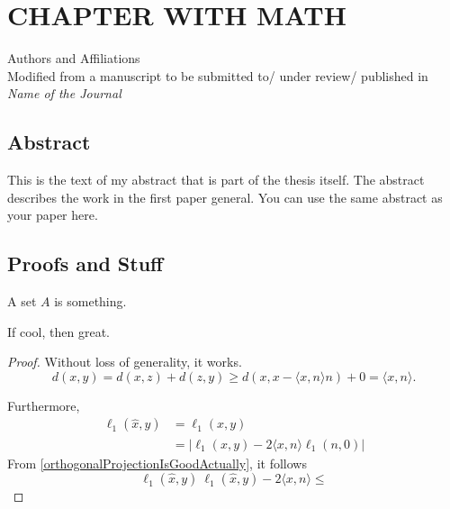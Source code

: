 \newcommand{\RipsD}{\operatorname{Rips}_1}
\newcommand{\Rips}{\operatorname{Rips}}
\newcommand{\ver}{\operatorname{ver}}
\newcommand{\diam}{\operatorname{Diam}}
\newcommand{\midR}{\operatorname{mid}}
\newcommand{\dN}{N_1^*}

\chapter{CHAPTER WITH MATH}
\begin{center}
    Authors and Affiliations \\
    Modified from a manuscript to be submitted to/ under review/ published in \textit{Name of the Journal}
\end{center}

\section{Abstract}
This is the text of my abstract that is part of the thesis itself.
The abstract describes the work in the first paper general. You can use the same abstract as your paper here.
\section{Proofs and Stuff}
\begin{definition}
    A set $A$ is something.
\end{definition}

\begin{lemma}
    If cool, then great.
\end{lemma}
\begin{proof}
    Without loss of generality, it works.
    \begin{equation}
    \label{orthogonalProjectionIsGoodActually}
        d(x,y)= d(x,z)+d(z,y) \geq d(x,x-\langle x,n\rangle n )+0 = \langle x,n\rangle.
    \end{equation}

    Furthermore,
    \begin{align}
        \ell_1(\hat{x},y) & = \ell_1 (x,y)                     \\
                          & =|\ell_1(x,y)-2\langle x,n\rangle \ell_1(n,0)|        
    \end{align}
    From \autoref{orthogonalProjectionIsGoodActually}, it follows \[\ell_1(\hat{x},y)\ \ell_1(\hat{x},y)-2\langle x,n\rangle \leq\] 
\end{proof}




